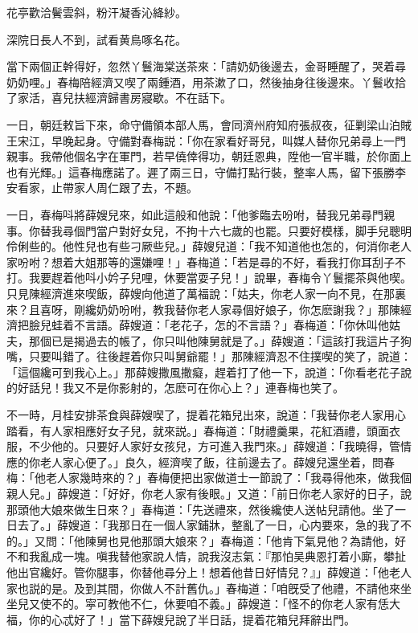 花亭歡洽鬢雲斜，粉汗凝香沁絳紗。

深院日長人不到，試看黄鳥啄名花。

當下兩個正幹得好，忽然丫鬟海棠送茶來：「請奶奶後邊去，金哥睡醒了，哭着尋奶奶哩。」春梅陪經濟又喫了兩鍾酒，用茶漱了口，然後抽身往後邊來。丫鬟收拾了家活，喜兒扶經濟歸書房寢歇。不在話下。

一日，朝廷敕旨下來，命守備領本部人馬，會同濟州府知府張叔夜，征剿梁山泊賊王宋江，早晚起身。守備對春梅説：「你在家看好哥兒，叫媒人替你兄弟尋上一門親事。我帶他個名字在軍門，若早僥倖得功，朝廷恩典，陞他一官半職，於你面上也有光輝。」這春梅應諾了。遲了兩三日，守備打點行裝，整率人馬，留下張勝李安看家，止帶家人周仁跟了去，不題。

一日，春梅呌將薛嫂兒來，如此這般和他說：「他爹臨去吩咐，替我兄弟尋門親事。你替我尋個門當户對好女兒，不拘十六七歲的也罷。只要好模樣，脚手兒聰明伶俐些的。他性兒也有些刁厥些兒。」薛嫂兒道：「我不知道他也怎的，何消你老人家吩咐？想着大姐那等的還嫌哩！」春梅道：「若是尋的不好，看我打你耳刮子不打。我要趕着他呌小妗子兒哩，休要當耍子兒！」說畢，春梅令丫鬟擺茶與他喫。只見陳經濟進來喫飯，薛嫂向他道了萬福說：「姑夫，你老人家一向不見，在那裏來？且喜呀，剛纔奶奶吩咐，教我替你老人家尋個好娘子，你怎麽謝我？」那陳經濟把臉兒蛙着不言語。薛嫂道：「老花子，怎的不言語？」春梅道：「你休叫他姑夫，那個已是揭過去的帳了，你只叫他陳舅就是了。」薛嫂道：「這該打我這片子狗嘴，只要叫錯了。往後趕着你只叫舅爺罷！」那陳經濟忍不住撲喫的笑了，說道：「這個纔可到我心上。」那薛嫂撒風撒癡，趕着打了他一下，說道：「你看老花子說的好話兒！我又不是你影射的，怎麽可在你心上？」連春梅也笑了。

不一時，月桂安排茶食與薛嫂喫了，提着花箱兒出來，說道：「我替你老人家用心踏看，有人家相應好女子兒，就來説。」春梅道：「財禮羹果，花紅酒禮，頭面衣服，不少他的。只要好人家好女孩兒，方可進入我門來。」薛嫂道：「我曉得，管情應的你老人家心便了。」良久，經濟喫了飯，往前邊去了。薛嫂兒還坐着，問春梅：「他老人家幾時來的？」春梅便把出家做道士一節說了：「我尋得他來，做我個親人兒。」薛嫂道：「好好，你老人家有後眼。」又道：「前日你老人家好的日子，說那頭他大娘來做生日來？」春梅道：「先送禮來，然後纔使人送帖兒請他。坐了一日去了。」薛嫂道：「我那日在一個人家鋪牀，整亂了一日，心内要來，急的我了不的。」又問：「他陳舅也見他那頭大娘來？」春梅道：「他肯下氣見他？為請他，好不和我亂成一塊。嗔我替他家說人情，說我沒志氣：『那怕吴典恩打着小廝，攀扯他出官纔好。管你腿事，你替他尋分上！想着他昔日好情兒？』」薛嫂道：「他老人家也説的是。及到其間，你做人不計舊仇。」春梅道：「咱旣受了他禮，不請他來坐坐兒又使不的。寜可教他不仁，休要咱不義。」薛嫂道：「怪不的你老人家有恁大福，你的心忒好了！」當下薛嫂兒說了半日話，提着花箱兒拜辭出門。

